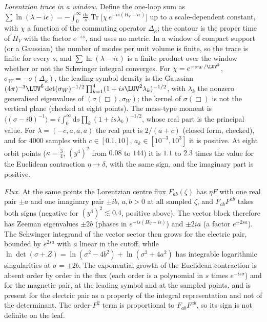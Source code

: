 \emph{Lorentzian trace in a window.} Define the one-loop sum as \(\sum\ln(\lambda-i\epsilon)=-\int_0^\infty\frac{\mathrm ds}{s}\operatorname{Tr}\bigl[\chi\,e^{-is(H_V-i\epsilon)}\bigr]\) up to a scale-dependent constant, with \(\chi\) a function of the commuting operator \(\Delta_\kappa\); the contour is the proper time of \(H_V\) with the factor \(e^{-\epsilon s}\), and uses no metric. In a window of compact support (or a Gaussian) the number of modes per unit volume is finite, so the trace is finite for every \(s\), and \(\sum\ln(\lambda-i\epsilon)\) is a finite product over the window whether or not the Schwinger integral converges. For \(\chi=e^{-\sigma_W/\LUV^2}\), \(\sigma_W=-\sigma(\Delta_\kappa)\), the leading-symbol density is the Gaussian \((4\pi)^{-3}\LUV^6\det(\sigma_W)^{-1/2}\prod_{k=1}^{4}(1+is\LUV^2\lambda_k)^{-1/2}\), with \(\lambda_k\) the nonzero generalised eigenvalues of \((\sigma(\Box),\sigma_W)\); the kernel of \(\sigma(\Box)\) is not the vertical plane (checked at eight points). The mass-type moment is \(\langle(\sigma-i0)^{-1}\rangle=i\int_0^\infty\mathrm ds\prod_k(1+is\lambda_k)^{-1/2}\), whose real part is the principal value. For \(\lambda=(-c,a,a,a)\) the real part is \(2/(a+c)\) (closed form, checked), and for \(4000\) samples with \(c\in[0.1,10]\), \(a_k\in[10^{-3},10^{3}]\) it is positive. At eight orbit points (\(\kappa=\tfrac34\), \((y^4)^2\) from \(0.08\) to \(144\)) it is \(1.1\) to \(2.3\) times the value for the Euclidean contraction \(\eta\to\delta\), with the same sign, and the imaginary part is positive.

\emph{Flux.} At the same points the Lorentzian centre flux \(F_{ab}(\zeta)\) has \(\eta F\) with one real pair \(\pm a\) and one imaginary pair \(\pm ib\), \(a,b>0\) at all sampled \(\zeta\), and \(F_{ab}F^{ab}\) takes both signs (negative for \((y^4)^2\lesssim0.4\), positive above). The vector block therefore has Zeeman eigenvalues \(\pm2b\) (phases in \(e^{-is(H_V-i\epsilon)}\)) and \(\pm2ia\) (a factor \(e^{\pm2sa}\)). The Schwinger integrand of the vector sector then grows for the electric pair, bounded by \(e^{2sa}\) with \(a\) linear in the cutoff, while \(\ln\det(\sigma+Z)=\ln(\sigma^2-4b^2)+\ln(\sigma^2+4a^2)\) has integrable logarithmic singularities at \(\sigma=\pm2b\). The exponential growth of the Euclidean contraction is absent order by order in the flux (each order is a polynomial in \(s\) times \(e^{-is\sigma}\)) and for the magnetic pair, at the leading symbol and at the sampled points, and is present for the electric pair as a property of the integral representation and not of the determinant. The order-\(F^2\) term is proportional to \(F_{ab}F^{ab}\), so its sign is not definite on the leaf.

